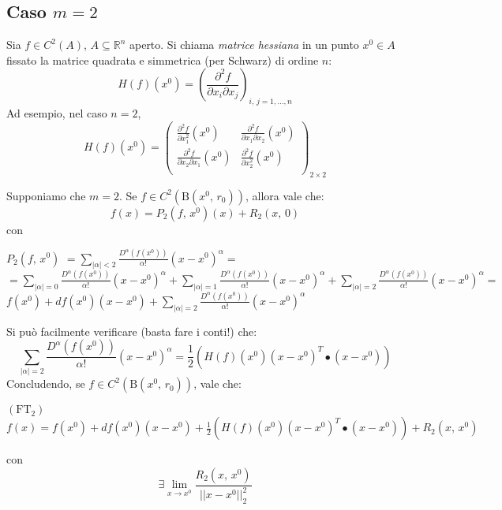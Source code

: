 \subsection{Caso $m=2$}

\begin{definition}
Sia $f \in C^2(A)$, $A \subseteq \mathbb{R}^n$ aperto. Si chiama \emph{matrice hessiana} in un punto $x^0 \in A$ fissato la matrice quadrata e simmetrica (per Schwarz) di ordine $n$:
$$
H(f)(x^0) = \left( \frac{\partial^2f}{\partial x_i \partial x_j} \right)_{i,\,j = 1,\ldots,n}
$$
Ad esempio, nel caso $n = 2$,
$$
H(f)(x^0) = \left(
\begin{array}{cc}
\displaystyle \frac{\partial^2f}{\partial x_1^2} (x^0) & \displaystyle \frac{\partial^2f}{\partial x_1 \partial x_2} (x^0)\\
\displaystyle \frac{\partial^2f}{\partial x_2 \partial x_1} (x^0) & \displaystyle \frac{\partial^2f}{\partial x_2^2} (x^0)\\
\end{array}
\right)_{2 \times 2}
$$
\end{definition}

\begin{obs}[importante]
Supponiamo che $m=2$. Se $f \in C^2(\mathrm{B}(x^0,\,r_0))$, allora vale che:
$$f(x) = P_2(f,\,x^0)(x) + R_2(x,\,0)$$
con
\begin{flushleft}
$\displaystyle P_2(f,\,x^0) $
$\displaystyle = \sum_{|\alpha| < 2} \frac{D^{\alpha}(f(x^0))}{\alpha!}(x-x^0)^{\alpha}=$
$\displaystyle = \sum_{|\alpha| = 0} \frac{D^{\alpha}(f(x^0))}{\alpha!}(x-x^0)^{\alpha} +
\sum_{|\alpha| = 1} \frac{D^{\alpha}(f(x^0))}{\alpha!}(x-x^0)^{\alpha}+
\sum_{|\alpha| = 2} \frac{D^{\alpha}(f(x^0))}{\alpha!}(x-x^0)^{\alpha} = $
$f(x^0) + df(x^0)(x-x^0) + \sum_{|\alpha| = 2} \frac{D^{\alpha}(f(x^0))}{\alpha!}(x-x^0)^{\alpha}$
\end{flushleft}
Si può facilmente verificare (basta fare i conti!) che:
$$\sum_{|\alpha| = 2} \frac{D^{\alpha}(f(x^0))}{\alpha!}(x-x^0)^{\alpha} = 
\frac{1}{2} \left( H(f)(x^0)(x-x^0)^T \bullet (x-x^0) \right)$$
Concludendo, se $f \in C^2(\mathrm{B}(x^0,\,r_0))$, vale che:
\begin{center}
$\mathrm{(FT_2)}$
\hfill
$\displaystyle f(x) = f(x^0)+df(x^0)(x-x^0)+\frac{1}{2} \left( H(f)(x^0)(x-x^0)^T \bullet (x-x^0) \right)
+ R_2(x,\,x^0)$
\hfill \null \\
\end{center}
con
$$
\exists \lim_{x \rightarrow x^0} \frac{R_2(x,\,x^0)}{||x-x^0||_2^2}
$$
\end{obs}











